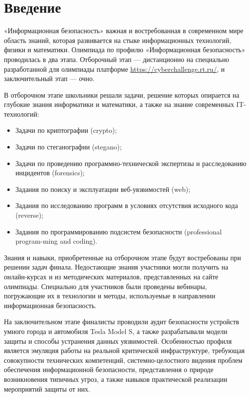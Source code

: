 %

\begingroup
\pagestyle{empty}

\section*{Введение}

«Информационная безопасность» важная и востребованная в современном мире область знаний, которая развивается на стыке информационных технологий, физики и математики. Олимпиада по профилю «Информационная безопасность» проводилась в два этапа. Отборочный этап — дистанционно на специально разработанной для олимпиады платформе \url{https://cyberchallenge.rt.ru/}, и заключительный этап — очно. 

В отборочном этапе школьники решали задачи, решение которых опирается на глубокие знания информатики и математики, а также на знание современных IT-технологий:
\begin{itemize}    
    \item Задачи по криптографии (crypto);
    \item Задачи по стеганографии (stegano);
    \item Задачи по проведению программно-технической экспертизы и расследованию инцидентов (forensics);
    \item Задания по поиску и эксплуатации веб-уязвимостей (web);
    \item Задания по исследованию программ в условиях отсутствия исходного кода (reverse);
    \item Задания по программированию подсистем безопасности (professional program-ming and coding).
\end{itemize}    

Знания и навыки, приобретенные на отборочном этапе будут востребованы при решении задач финала. Недостающие знания участники могли получить на онлайн-курсах и из методических материалов, представленных на сайте олимпиады. Специально для участников были проведены вебинары, погружающие их в технологии и методы, используемые в направлении информационная безопасность. 

На заключительном этапе финалисты проводили аудит безопасности устройств умного города и автомобиля Tesla Model S, а также разрабатывали модели защиты и способы устранения данных уязвимостей. Особенностью профиля является эмуляция работы на реальной критической инфраструктуре, требующая совокупности технических компетенций, системно-целостного видения проблем обеспечения информационной безопасности, представления о природе возникновения типичных угроз, а также навыков практической реализации мероприятий защиты от них.


\clearpage
\endgroup